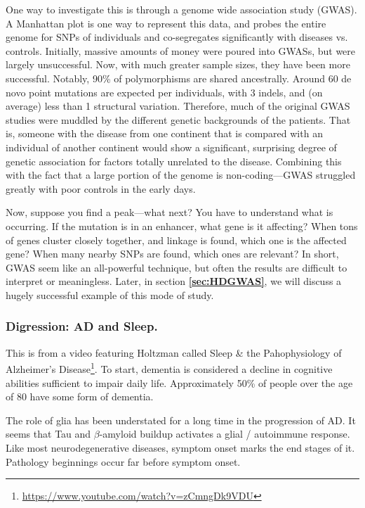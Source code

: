 One way to investigate this is through a genome wide association study (GWAS). A Manhattan plot is one way to represent this data, and probes the entire genome for SNPs of individuals and co-segregates significantly with diseases vs. controls. Initially, massive amounts of money were poured into GWASs, but were largely unsuccessful. Now, with much greater sample sizes, they have been more successful. Notably, 90\% of polymorphisms are shared ancestrally. Around 60 de novo point mutations are expected per individuals, with 3 indels, and (on average) less than 1 structural variation. Therefore, much of the original GWAS studies were muddled by the different genetic backgrounds of the patients. That is, someone with the disease from one continent that is compared with an individual of another continent would show a significant, surprising degree of genetic association for factors totally unrelated to the disease. Combining this with the fact that a large portion of the genome is non-coding---GWAS struggled greatly with poor controls in the early days.\newline

Now, suppose you find a peak---what next? You have to understand what is occurring. If the mutation is in an enhancer, what gene is it affecting? When tons of genes cluster closely together, and linkage is found, which one is the affected gene? When many nearby SNPs are found, which ones are relevant? In short, GWAS seem like an all-powerful technique, but often the results are difficult to interpret or meaningless. Later, in section \textbf{\ref{sec:HDGWAS}}, we will discuss a hugely successful example of this mode of study. 


\subsubsection*{Digression: AD and Sleep.} 

This is from a video featuring Holtzman called Sleep \& the Pahophysiology of Alzheimer's Disease\footnote{\url{https://www.youtube.com/watch?v=zCmngDk9VDU}}. To start, dementia is considered a decline in cognitive abilities sufficient to impair daily life. Approximately 50\% of people over the age of 80 have some form of dementia.\newline

The role of glia has been understated for a long time in the progression of AD. It seems that Tau and $\beta$-amyloid buildup activates a glial / autoimmune response. Like most neurodegenerative diseases, symptom onset marks the end stages of it. Pathology beginnings occur far before symptom onset.\newline

